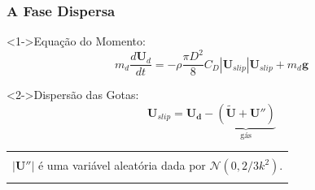 \documentclass[bars,mathserif]{beamer}
\newcommand{\bv}[1]{\mathbf{#1}}
\begin{document}
%
\begin{frame}
\frametitle{A Fase Dispersa}
\begin{block}<1->{Equação do Momento:}
\begin{equation*}
m_d \frac{d\bv{U}_d}{dt} =-\rho\frac{\pi D^2}{8}C_D | \bv{U}_{slip}| \bv{U}_{slip} + m_d \bv{g}
\end{equation*} 
\end{block}
\begin{block}<2->{Dispersão das Gotas:}
 \begin{equation*}
 \bv{U}_{slip} = \bv{U_d} - \underbrace{(\tilde{\bv{U}}+\bv{U}'')}_{\text{g\'as}}
\end{equation*}
\end{block}

\footnotesize
\begin{tabular}{|l|}
\hline \\
$|\bv{U}''|$ é uma variável aleatória dada por $\mathcal{N} (0,2/3 k^2)$.\\ \\
\hline 
\end{tabular}
\end{frame}
%
\end{document}
